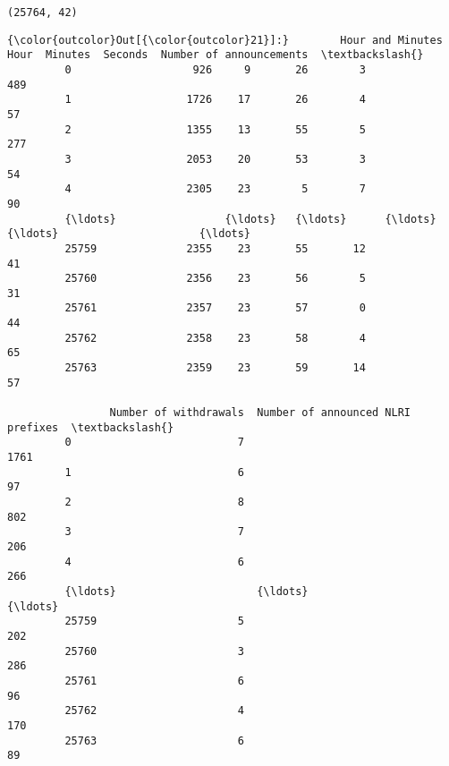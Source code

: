 \documentclass[11pt]{article}
\begin{document}
    \begin{Verbatim}[commandchars=\\\{\}]
(25764, 42)

    \end{Verbatim}

\begin{Verbatim}[commandchars=\\\{\}]
{\color{outcolor}Out[{\color{outcolor}21}]:}        Hour and Minutes  Hour  Minutes  Seconds  Number of announcements  \textbackslash{}
         0                   926     9       26        3                      489   
         1                  1726    17       26        4                       57   
         2                  1355    13       55        5                      277   
         3                  2053    20       53        3                       54   
         4                  2305    23        5        7                       90   
         {\ldots}                 {\ldots}   {\ldots}      {\ldots}      {\ldots}                      {\ldots}   
         25759              2355    23       55       12                       41   
         25760              2356    23       56        5                       31   
         25761              2357    23       57        0                       44   
         25762              2358    23       58        4                       65   
         25763              2359    23       59       14                       57   
         
                Number of withdrawals  Number of announced NLRI prefixes  \textbackslash{}
         0                          7                               1761   
         1                          6                                 97   
         2                          8                                802   
         3                          7                                206   
         4                          6                                266   
         {\ldots}                      {\ldots}                                {\ldots}   
         25759                      5                                202   
         25760                      3                                286   
         25761                      6                                 96   
         25762                      4                                170   
         25763                      6                                 89   
         

\end{Verbatim}
\end{document}
